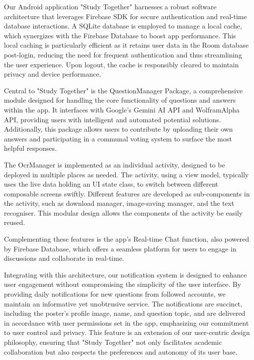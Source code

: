 

Our Android application "Study Together" harnesses a robust software architecture that leverages Firebase SDK for secure authentication and real-time database interactions. A SQLite database is employed to manage a local cache, which synergizes with the Firebase Database to boost app performance. This local caching is particularly efficient as it retains user data in the Room database post-login, reducing the need for frequent authentication and thus streamlining the user experience. Upon logout, the cache is responsibly cleared to maintain privacy and device performance.

Central to "Study Together" is the QuestionManager Package, a comprehensive module designed for handling the core functionality of questions and answers within the app. It interfaces with Google's Gemini AI API and WolframAlpha API, providing users with intelligent and automated potential solutions. Additionally, this package allows users to contribute by uploading their own answers and participating in a communal voting system to surface the most helpful responses.

The OcrManager is implemented as an individual activity, designed to be deployed in multiple places as needed. The activity, using a view model, typically uses the live data holding an UI state class, to switch between different composable screens swiftly. Different features are developed as sub-components in the activity, such as download manager, image-saving manager, and the text recogniser. This modular design allows the components of the activity be easily reused.

Complementing these features is the app's Real-time Chat function, also powered by Firebase Database, which offers a seamless platform for users to engage in discussions and collaborate in real-time.

Integrating with this architecture, our notification system is designed to enhance user engagement without compromising the simplicity of the user interface. By providing daily notifications for new questions from followed accounts, we maintain an informative yet unobtrusive service. The notifications are succinct, including the poster's profile image, name, and question topic, and are delivered in accordance with user permissions set in the app, emphasizing our commitment to user control and privacy. This feature is an extension of our user-centric design philosophy, ensuring that "Study Together" not only facilitates academic collaboration but also respects the preferences and autonomy of its user base.
 

